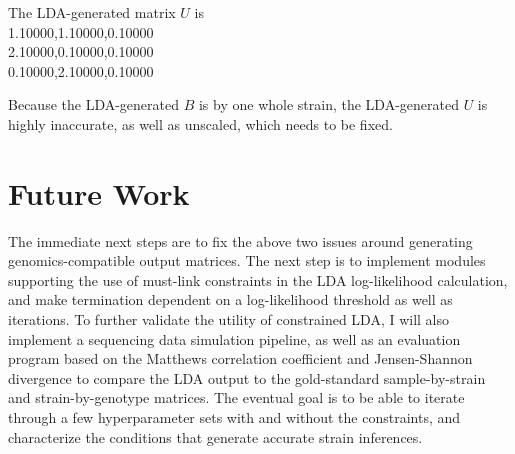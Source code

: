 \documentclass{article}
\begin{document}
The LDA-generated matrix $U$ is \\
1.10000,1.10000,0.10000 \\
2.10000,0.10000,0.10000 \\
0.10000,2.10000,0.10000

Because the LDA-generated $B$ is by one whole strain, the LDA-generated $U$ is highly inaccurate, as well as unscaled, which needs to be fixed.


\section{Future Work}

The immediate next steps are to fix the above two issues around generating genomics-compatible output matrices. The next step is to implement modules supporting the use of must-link constraints in the LDA log-likelihood calculation, and make termination dependent on a log-likelihood threshold as well as iterations. To further validate the utility of constrained LDA, I will also implement a sequencing data simulation pipeline, as well as an evaluation program based on the Matthews correlation coefficient and Jensen-Shannon divergence to compare the LDA output to the gold-standard sample-by-strain and strain-by-genotype matrices. The eventual goal is to be able to iterate through a few hyperparameter sets with and without the constraints, and characterize the conditions that generate accurate strain inferences. 

\printbibliography
\end{document}
